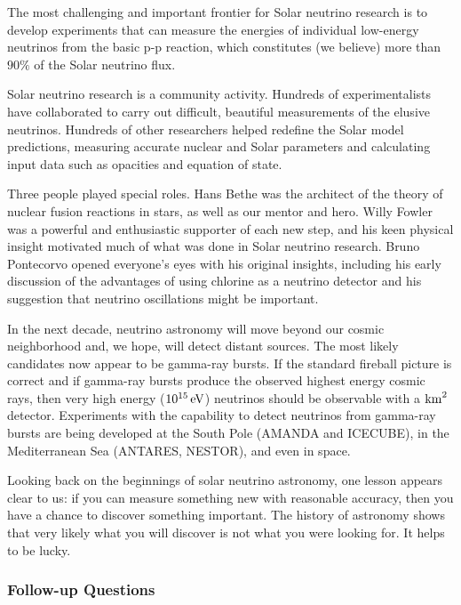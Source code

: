 \documentclass[a4paper,10pt]{article}
\begin{document}
{\noindent}The most challenging and important frontier for Solar neutrino research is to develop experiments that can measure the energies of individual low-energy neutrinos from the basic p-p reaction, which constitutes (we believe) more than $90\%$ of the Solar neutrino flux. 

{\noindent}Solar neutrino research is a community activity. Hundreds of experimentalists have collaborated to carry out difficult, beautiful measurements of the elusive neutrinos. Hundreds of other researchers helped redefine the Solar model predictions, measuring accurate nuclear and Solar parameters and calculating input data such as opacities and equation of state.

{\noindent}Three people played special roles. Hans Bethe was the architect of the theory of nuclear fusion reactions in stars, as well as our mentor and hero. Willy Fowler was a powerful and enthusiastic supporter of each new step, and his keen physical insight motivated much of what was done in Solar neutrino research. Bruno Pontecorvo opened everyone's eyes with his original insights, including his early discussion of the advantages of using chlorine as a neutrino detector and his suggestion that neutrino oscillations might be important.

{\noindent}In the next decade, neutrino astronomy will move beyond our cosmic neighborhood and, we hope, will detect distant sources. The most likely candidates now appear to be gamma-ray bursts. If the standard fireball picture is correct and if gamma-ray bursts produce the observed highest energy cosmic rays, then very high energy ($10^{15}\,{\rm eV}$) neutrinos should be observable with a ${\rm km}^2$ detector. Experiments with the capability to detect neutrinos from gamma-ray bursts are being developed at the South Pole (AMANDA and ICECUBE), in the Mediterranean Sea (ANTARES, NESTOR), and even in space.

{\noindent}Looking back on the beginnings of solar neutrino astronomy, one lesson appears clear to us: if you can measure something new with reasonable accuracy, then you have a chance to discover something important. The history of astronomy shows that very likely what you will discover is not what you were looking for. It helps to be lucky. 

\subsubsection{Follow-up Questions}
\end{document}

